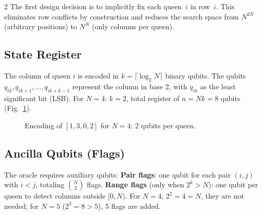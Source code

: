 \documentclass[9pt, a4paper]{extarticle}
\begin{document}
\begin{multicols}{2}
The first design decision is to implicitly fix each queen~$i$ in row~$i$. This eliminates row conflicts by construction and reduces the search space from $N^{2N}$ (arbitrary positions) to $N^N$ (only columns per queen).

\subsection{State Register}

The column of queen $i$ is encoded in $k = \lceil\log_2 N\rceil$ binary qubits. The qubits $q_{ik}, q_{ik+1}, \ldots, q_{ik+k-1}$ represent the column in base 2, with $q_{ik}$ as the least significant bit (LSB).
For $N\!=\!4$: $k\!=\!2$, total register of $n = Nk = 8$ qubits (Fig.~\ref{fig:encoding}).

\begin{figure}[H]
    \centering
    \caption{Encoding of $[1,3,0,2]$ for $N=4$: 2 qubits per queen.}
    \label{fig:encoding}
\end{figure}

\subsection{Ancilla Qubits (Flags)}

The oracle requires auxiliary qubits:
\textbf{Pair flags}: one qubit for each pair $(i,j)$ with $i<j$, totaling $\binom{N}{2}$ flags.
\textbf{Range flags} (only when $2^k > N$): one qubit per queen to detect columns outside $[0, N)$.
For $N\!=\!4$, $2^2 = 4 = N$, they are not needed; for $N\!=\!5$ ($2^3 = 8 > 5$), 5 flags are added.


\end{multicols}
\end{document}
